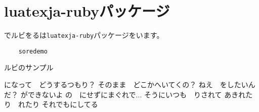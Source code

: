 \section{luatexja-rubyパッケージ}

でルビをるは\texttt{luatexja-ruby}パッケージをいます。

\begin{listing}
\begin{verbatim}
    soredemo
\end{verbatim}
\caption{ルビのサンプル}
\end{listing}




になって　どうするつもり？
そのまま　どこかへいてくの？
ねえ　をしたいんだ？
ができないよ
の　にせずにまぐれで...
そうにいつも　りされて
あきれたり　れたり
それでもにしてる
